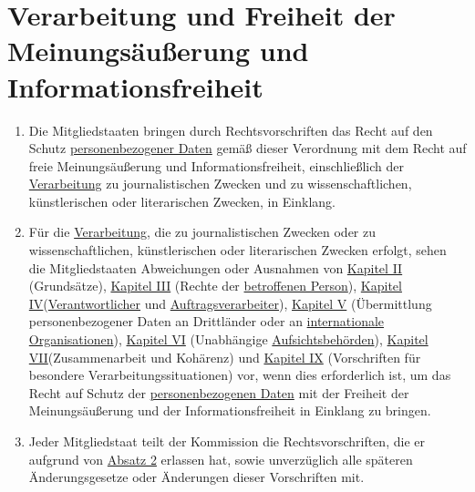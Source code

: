 \chapter{Verarbeitung und Freiheit der Meinungsäußerung und Informationsfreiheit}
\label{ch:85}


\begin{enumerate}

  \item Die Mitgliedstaaten bringen durch Rechtsvorschriften das Recht auf den Schutz \hyperref[itm:04-1]{personenbezogener Daten} gemäß
   dieser Verordnung mit dem Recht auf freie Meinungsäußerung und Informationsfreiheit, einschließlich der \hyperref[itm:04-2]{Verarbeitung}
   zu journalistischen Zwecken und zu wissenschaftlichen, künstlerischen oder literarischen Zwecken, in Einklang.
  \label{itm:85-1}

  \item Für die \hyperref[itm:04-2]{Verarbeitung}, die zu journalistischen Zwecken oder zu wissenschaftlichen, künstlerischen oder
   literarischen Zwecken erfolgt, sehen die Mitgliedstaaten Abweichungen oder Ausnahmen von \hyperref[part:2]
   {Kapitel II} (Grundsätze), \hyperref[part:3]{Kapitel III} (Rechte der \hyperref[itm:04-1]{betroffenen Person}), \hyperref[part:4]
   {Kapitel IV}(\hyperref[itm:04-7]{Verantwortlicher} und \hyperref[itm:04-8]{Auftragsverarbeiter}), \hyperref[part:5]{Kapitel V} (Übermittlung personenbezogener
   Daten an Drittländer oder an \hyperref[itm:04-29]{internationale Organisationen}), \hyperref[part:6]{Kapitel VI}
   (Unabhängige \hyperref[itm:04-21]{Aufsichtsbehörden}), \hyperref[part:7]{Kapitel VII}(Zusammenarbeit und Kohärenz) und \hyperref[part:9]
   {Kapitel IX} (Vorschriften für besondere Verarbeitungssituationen) vor, wenn dies erforderlich ist, um das Recht auf
   Schutz der \hyperref[itm:04-1]{personenbezogenen Daten} mit der Freiheit der Meinungsäußerung und der Informationsfreiheit in Einklang zu
   bringen.
  \label{itm:85-2}

  \item Jeder Mitgliedstaat teilt der Kommission die Rechtsvorschriften, die er aufgrund von \hyperref[itm:85-2]
   {Absatz 2} erlassen hat, sowie unverzüglich alle späteren Änderungsgesetze oder Änderungen dieser Vorschriften mit.
  \label{itm:85-3}

\end{enumerate}


